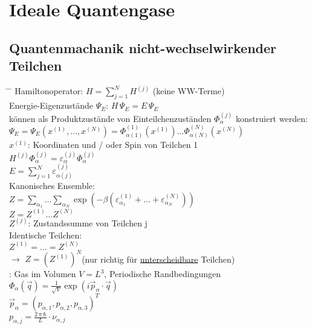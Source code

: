 \section{Ideale Quantengase}
\subsection{Quantenmachanik nicht-wechselwirkender Teilchen}
\begin{tabbing}
\hspace{4em} \= \hspace{4em} \= \kill
Hamiltonoperator: \quad $H = \sum\limits_{j=1}^{N} H^{(j)}$ \quad (keine WW-Terme)\\
Energie-Eigenzustände $\Psi_E$: \quad $H \, \Psi_E = E \, \Psi_E$\\
können als Produktzustände von Einteilchenzuständen $\Phi_{\alpha}^{(j)}$ konstruiert werden:\\
\> $\Psi_E = \Psi_E\left(x^{(1)},\dots, x^{(N)}\right) = \Phi_{\alpha(1)}^{(1)}\left(x^{(1)}\right) \dots \Phi_{\alpha(N)}^{(N)}\left(x^{(N)}\right)$\\
\> $x^{(1)}$: Koordinaten und / oder Spin von Teilchen 1\\
\> $H^{(j)}\Phi_{\alpha}^{(j)} = \varepsilon_{\alpha}^{(j)} \Phi_{\alpha}^{(j)}$\\
\> $E = \sum\limits_{j=1}^{N} \varepsilon_{\alpha(j)}^{(j)}$\\
Kanonisches Ensemble:\\
\> $ Z = \sum\limits_{\alpha_1}\dots \sum\limits_{\alpha_N} \exp \left(-\beta \left(\varepsilon_{\alpha_1}^{(1)} + \dots + \varepsilon_{\alpha_N}^{(N)}\right)\right)$\\
\> $ Z = Z^{(1)} \dots Z^{(N)}$\\
\> $Z^{(j)}$: Zustandssumme von Teilchen j\\
Identische Teilchen:\\
\> $Z^{(1)} = \dots = Z^{(N)}$\\
$\rightarrow$ \> $Z = \left(Z^{(1)}\right)^N$\quad (nur richtig für \underline{unterscheidbare} Teilchen)\\
: Gas im Volumen $V= L^3$, Periodische Randbedingungen\\
\> $\Phi_{\alpha}\left(\vec{q}\right) = \frac{1}{\sqrt{V}} \exp \left(i \vec{p}_{\alpha}\cdot \vec{q}\right)$\\
\>$\vec{p}_{\alpha} = \left(p_{\alpha,1}, p_{\alpha,2}, p_{\alpha,3}\right)^T$\\
\> $p_{\alpha,j} = \frac{2\,\pi \,\hbar}{L}\cdot \nu_{\alpha,j}$

\end{tabbing}
